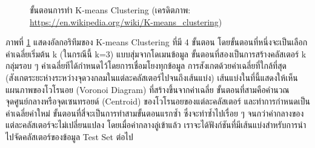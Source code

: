 \begin{figure}[H]
    \hspace{1em}
    \caption{ขั้นตอนการทำ K-means Clustering (เครดิตภาพ: \url{https://en.wikipedia.org/wiki/K-means_clustering})}
    \label{fig:k_means}
\end{figure}
 
ภาพที่ \ref{fig:k_means} แสดงอัลกอริทึมของ K-means Clustering ที่มี 4 ขั้นตอน โดยขั้นตอนที่หนึ่งจะเป็นเลือกค่าเฉลี่ยเริ่มต้น k 
(ในกรณีนี้ k=3) แบบสุ่มจากโดเมนข้อมูล ขั้นตอนที่สองเป็นการสร้างคลัสเตอร์ k กลุ่มรอบ ๆ ค่าเฉลี่ยทีได้กำหนดไว้โดยการเชื่อมโยงทุกข้อมูล%
การสังเกตด้วยค่าเฉลี่ยที่ใกล้ที่สุด (สังเกตระยะห่างระหว่างจุดวงกลมในแต่ละคลัสเตอร์ไปจนถึงเส้นแบ่ง) เส้นแบ่งในที่นี้แสดงให้เห็นแผนภาพของโวโรนอย 
(Voronoi Diagram) ที่สร้างขึ้นจากค่าเฉลี่ย ขั้นตอนที่สามคือคำนวณจุดศูนย์กลางหรือจุดเซนทรอยด์ (Centroid) ของโวโรนอยของแต่ละคลัสเตอร์%
และทำการกำหนดเป็นค่าเฉลี่ยค่าใหม่ ขั้นตอนที่สี่จะเป็นการทำสามขั้นตอนแรกซ้ำ ซึ่งจะทำซ้ำไปเรื่อย ๆ จนกว่าค่ากลางของแต่ละคลัสเตอร์จะไม่เปลี่ยนแปลง
โดยเมื่อค่ากลางลู่เข้าแล้ว เราจะได้ฟังก์ชันที่มีเส้นแบ่งสำหรับการนำไปจัดคลัสเตอร์ของข้อมูล Test Set ต่อไป
